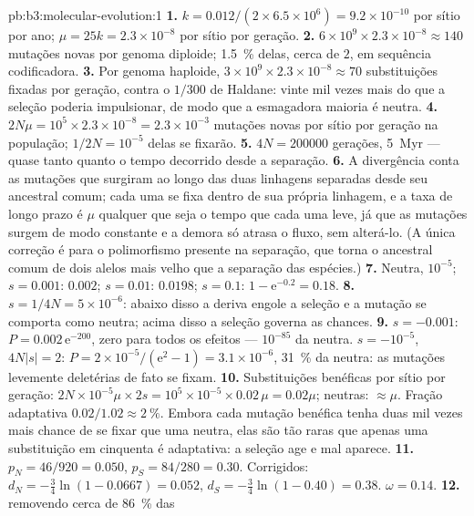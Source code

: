 \begin{solution}{pb:b3:molecular-evolution:1}
\textbf{1.} $k = 0.012/(2\times 6.5\times 10^{6}) = 9.2\times 10^{-10}$ por
sítio por ano; $\mu = 25k = 2.3\times 10^{-8}$ por sítio por geração.
\textbf{2.} $6\times 10^{9}\times 2.3\times 10^{-8} \approx 140$ mutações
novas por genoma diploide; \qty{1.5}{\%} delas, cerca de $2$, em
sequência codificadora.
\textbf{3.} Por genoma haploide, $3\times 10^{9}\times 2.3\times 10^{-8}
\approx 70$ substituições fixadas por geração, contra o $1/300$ de
Haldane: vinte mil vezes mais do que a seleção poderia impulsionar, de
modo que a esmagadora maioria é neutra.
\textbf{4.} $2N\mu = 10^{5}\times 2.3\times 10^{-8} = 2.3\times 10^{-3}$
mutações novas por sítio por geração na população; $1/2N =
10^{-5}$ delas
se fixarão.
\textbf{5.} $4N = \num{200000}$ gerações, \qty{5}{Myr} --- quase tanto
quanto o tempo decorrido desde a separação.
\textbf{6.} A divergência conta as mutações que surgiram ao longo das duas
linhagens separadas desde seu ancestral comum; cada uma se fixa dentro de
sua própria linhagem, e a taxa de longo prazo é $\mu$ qualquer que seja o
tempo que cada uma leve, já que as mutações surgem de modo constante e a
demora só atrasa o fluxo, sem alterá-lo. (A única correção é para o
polimorfismo presente na separação, que torna o ancestral comum de dois
alelos mais velho que a separação das espécies.)
\textbf{7.} Neutra, $10^{-5}$; $s = 0.001$: $0.002$; $s = 0.01$: $0.0198$;
$s = 0.1$: $1 - \mathrm{e}^{-0.2} = 0.18$.
\textbf{8.} $s = 1/4N = 5\times 10^{-6}$: abaixo disso a deriva engole a
seleção e a mutação se comporta como neutra; acima disso a seleção
governa as chances.
\textbf{9.} $s = -0.001$: $P = 0.002\,\mathrm{e}^{-200}$, zero para todos
os efeitos --- $10^{-85}$ da neutra. $s = -10^{-5}$, $4N|s| = 2$: $P =
2\times 10^{-5}/(\mathrm{e}^{2} - 1) = 3.1\times 10^{-6}$, \qty{31}{\%} da
neutra: as mutações levemente deletérias de fato se fixam.
\textbf{10.} Substituições benéficas por sítio por geração: $2N\times
10^{-5}\mu\times 2s = 10^{5}\times 10^{-5}\times 0.02\,\mu = 0.02\mu$;
neutras: $\approx\mu$. Fração adaptativa $0.02/1.02 \approx \qty{2}{\%}$.
Embora cada mutação benéfica tenha duas mil vezes mais chance de se fixar
que uma neutra, elas são tão raras que apenas uma substituição em
cinquenta é adaptativa: a seleção age e mal aparece.
\textbf{11.} $p_{N} = 46/920 = 0.050$, $p_{S} = 84/280 = 0.30$.
Corrigidos: $d_{N} = -\tfrac{3}{4}\ln(1 - 0.0667) = 0.052$, $d_{S} = -\tfrac{3}{4}
\ln(1 - 0.40) = 0.38$. $\omega = 0.14$.
\textbf{12.}  removendo cerca de \qty{86}{\%} das

\end{solution}

